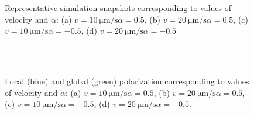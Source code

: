 \documentclass[../../master_thesis_np.tex]{subfiles}
\begin{document}
\begin{figure}[htp]
			\caption{Representative simulation snapshots corresponding to values of velocity and $\alpha$: (a) $v = \SI{10}{\um \per \second} \alpha = 0.5$, (b) $v = \SI{20}{\um \per \second} \alpha = 0.5$, (c) $v = \SI{10}{\um \per \second} \alpha = -0.5$, (d) $v = \SI{20}{\um \per \second} \alpha = -0.5$}
			\label{fig:lj_velocity_situa}
		\end{figure}
		
		\begin{figure}[htp]
			\centering\
			\\
			\\
			
			\caption{Local (blue) and global (green) polarization corresponding to values of velocity and $\alpha$: (a) $v = \SI{10}{\um \per \second} \alpha = 0.5$, (b) $v = \SI{20}{\um \per \second} \alpha = 0.5$, (c) $v = \SI{10}{\um \per \second} \alpha = -0.5$, (d) $v = \SI{20}{\um \per \second} \alpha = -0.5$.}
			\label{fig:lj_velocity_pol}
		\end{figure}
		
\end{document}
